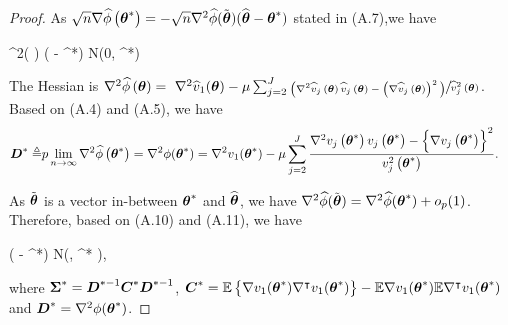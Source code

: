 \begin{proof}
	As $	\sqrt{n}\nabla\widehat{\phi}\left(\boldsymbol{\theta}^*\right) =  - \sqrt{n} \nabla^2\widehat{\phi}( \tilde{\boldsymbol{\theta}}) (\widehat{\boldsymbol{\theta}} - \boldsymbol{\theta}^{*})$ stated in (A.7),we have
	\begin{flalign}
	 \nabla^2\wh{\phi}( \tilde{\bs{\theta}}) (\widehat{\bs{\theta}} - \bs{\theta}^{*})  N(0, ^*)
	\end{flalign} 	
	The Hessian is $\nabla^2\widehat{\phi}\left(\boldsymbol{\theta}\right) = \,\,\nabla^2\widehat{v}_1(\boldsymbol{\theta}) - \mu \sum_{j=2}^J \sfrac{\big(\nabla^2\widehat{v}_j\left( \boldsymbol{\theta}\right)\widehat{v}_j\left( \boldsymbol{\theta}\right)- \left(\nabla\widehat{v}_j\left( \boldsymbol{\theta}\right)\right)^2\big)}{\widehat{v}^2_j\left( \boldsymbol{\theta}\right)}$. Based on (A.4) and (A.5), we have
	\begin{gather}
	\begin{flalign}
	\boldsymbol{D}^* \triangleq & p\lim_{n \to \infty}\nabla^2\widehat{\phi}\left(\boldsymbol{\theta}^*\right) =  \nabla^2 \phi(\boldsymbol{\theta}^*)
	=\nabla^2{v}_1(\boldsymbol{\theta}^*) - \mu \sum_{j=2}^J \frac{\nabla^2{v}_j\left( \boldsymbol{\theta}^*\right)v_j\left( \boldsymbol{\theta}^*\right)- \left\{\nabla v_j\left( \boldsymbol{\theta}^*\right)\right\}^2}{v^2_j\left( \boldsymbol{\theta}^*\right)}.
	\end{flalign}
	\end{gather}
	
	As $\tilde{\boldsymbol{\theta}}$ is a vector in-between $\boldsymbol{\theta}^*$ and $\widehat{\boldsymbol{\theta}}$, we have $\nabla^2\widehat{\phi}(\tilde{\boldsymbol{\theta}}) = \nabla^2\widehat{\phi}(\boldsymbol{\theta}^*) + o_p(1)$. Therefore, based on (A.10) and (A.11), we have 
	\begin{flalign*}
	\lt(\widehat{\bs{\theta}} - \bs{\theta}^*\rt)  N\lt(, \bs{\Sigma}^* \rt),
	\end{flalign*}
	where $\boldsymbol{\Sigma}^* = \boldsymbol{D}^{*-1}\boldsymbol{C}^{*}\boldsymbol{D}^{*-1}$, 
	$\boldsymbol{C}^* =\mathbb{E}\left\{  \nabla v_1(\boldsymbol{\theta}^*)\nabla^{\intercal} v_1(\boldsymbol{\theta}^*) \right\} - \mathbb{E}\nabla v_1(\boldsymbol{\theta}^*) \mathbb{E}\nabla^{\intercal} v_1(\boldsymbol{\theta}^*)$ and $\boldsymbol{D}^*  =  \nabla^2 \phi(\boldsymbol{\theta}^*)$.
\end{proof}